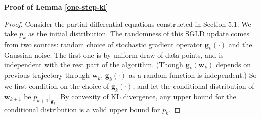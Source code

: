 \documentclass[final,12pt]{colt2018} %
\newcommand{\w}{\bm{w}}
\begin{document}
\noindent \textbf{Proof of Lemma \ref{one-step-kl}}
\begin{proof}
Consider the partial differential equations constructed in Section 5.1. We take $p_k$ as the initial distribution. The randomness of this SGLD update comes from two sources: random choice of stochastic gradient operator $\bm{g}_k(\cdot)$ and the Gaussian noise. The first one is by uniform draw of data points, and is independent with the rest part of the algorithm. (Though $\bm{g}_k(\w_k)$ depends on previous trajectory through $\w_k$, $\bm{g}_k(\cdot)$ as a random function is independent.) So we first condition on the choice of $\bm{g}_k(\cdot)$, and let the conditional distribution of $\w_{k+1}$ be $p_{k+1}|_{\bm{g}_k}$. By convexity of KL divergence, any upper bound for the conditional distribution is a valid upper bound for $p_k$.


\end{proof}
\end{document}
